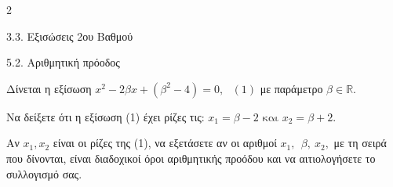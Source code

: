 \begin{ylh}{2}
    \item 3.3. Εξισώσεις 2ου Βαθμού
    \item 5.2. Αριθμητική πρόοδος
\end{ylh}
Δίνεται η εξίσωση $x^{2} - 2\beta x + \left( \beta^{2} - 4 \right) = 0,\text{   }(1)$ με παράμετρο $\beta\mathbb{\in R.}$

\begin{alist}
\item Να δείξετε ότι η εξίσωση (1) έχει ρίζες τις: $x_{1} = \beta - 2\text{ και }x_{2} = \beta + 2.$
\item Αν $x_{1},x_{2}$ είναι οι ρίζες της (1), να εξετάσετε αν οι αριθμοί $x_{1},\ \ \beta,{\ x}_{2},$ με τη σειρά που δίνονται, είναι διαδοχικοί όροι αριθμητικής προόδου και να αιτιολογήσετε το συλλογισμό σας.
\end{alist}

